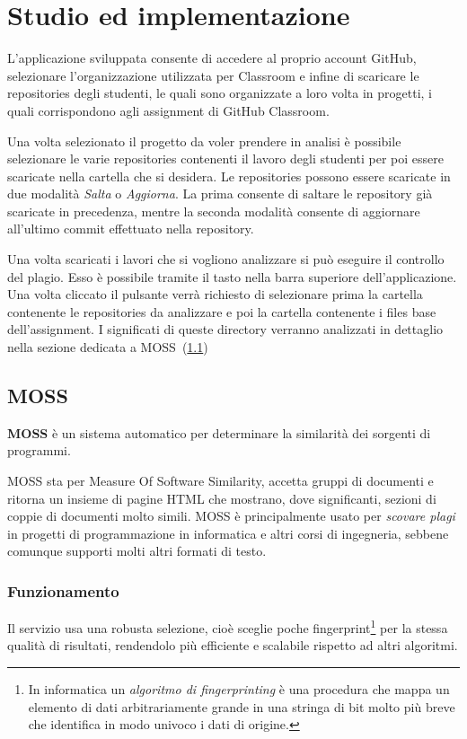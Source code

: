 \chapter{Studio ed implementazione}
	L'applicazione sviluppata consente di accedere al proprio account GitHub, selezionare l'organizzazione utilizzata per Classroom e infine di scaricare le repositories degli studenti, le quali sono organizzate a loro volta in progetti, i quali corrispondono agli assignment di GitHub Classroom.
	
	Una volta selezionato il progetto da voler prendere in analisi è possibile selezionare le varie repositories contenenti il lavoro degli studenti per poi essere scaricate nella cartella che si desidera.
	Le repositories possono essere scaricate in due modalità \textit{Salta} o \textit{Aggiorna}. La prima consente di saltare le repository già scaricate in precedenza, mentre la seconda modalità consente di aggiornare all'ultimo commit effettuato nella repository.
	
	Una volta scaricati i lavori che si vogliono analizzare si può eseguire il controllo del plagio. Esso è possibile tramite il tasto nella barra superiore dell'applicazione. Una volta cliccato il pulsante verrà richiesto di selezionare prima la cartella contenente le repositories da analizzare e poi la cartella contenente i files base dell'assignment.
	I significati di queste directory verranno analizzati in dettaglio nella sezione dedicata a MOSS~(\ref{def:MOSS})
	
	
	\section{MOSS}\label{def:MOSS}	
		\textbf{MOSS} è un sistema automatico per determinare la similarità dei sorgenti di programmi. 
		
		MOSS sta per Measure Of Software Similarity, accetta gruppi di documenti e ritorna un insieme di pagine HTML che mostrano, dove significanti, sezioni di coppie di documenti molto simili. MOSS è principalmente usato per \textit{scovare plagi} in progetti di programmazione in informatica e altri corsi di ingegneria, sebbene comunque supporti molti altri formati di testo. 
		
		\subsection*{Funzionamento}
		Il servizio usa una robusta selezione, cioè sceglie poche fingerprint\footnote{In informatica un \textit{algoritmo di fingerprinting} è una procedura che mappa un elemento di dati arbitrariamente grande in una stringa di bit molto più breve che identifica in modo univoco i dati di origine.} per la stessa qualità di risultati, rendendolo più efficiente e scalabile rispetto ad altri algoritmi.
		
